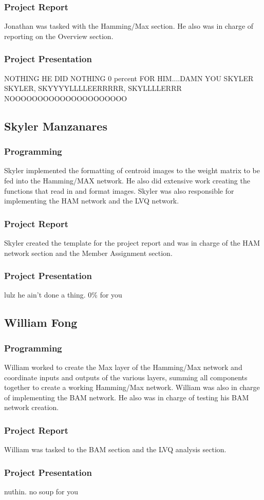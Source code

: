 \documentclass{article}
\begin{document}
\subsubsection{Project Report}
Jonathan was tasked with the Hamming/Max section. He also was in charge of reporting on the Overview section.

\subsubsection{Project Presentation}
NOTHING HE DID NOTHING 0 percent FOR HIM....DAMN YOU SKYLER
SKYLER, SKYYYYLLLLEERRRRR, SKYLLLLERRR NOOOOOOOOOOOOOOOOOOOOO
\subsection{Skyler Manzanares}

\subsubsection{Programming}
Skyler implemented the formatting of centroid images to the weight matrix to be fed into the Hamming/MAX network. He also did extensive work creating the functions that read in and format images. Skyler was also responsible for implementing
the HAM network and the LVQ network.

\subsubsection{Project Report}
Skyler created the template for the project report and was in charge of the HAM 
network section and the Member Assignment section.

\subsubsection{Project Presentation}
lulz he ain't done a thing.  0\% for you

\subsection{William Fong}
\subsubsection{Programming}
William worked to create the Max layer of the Hamming/Max network and coordinate 
inputs and outputs of the various layers, summing all components together to create a working Hamming/Max network. William was also in charge of implementing the BAM network. He also was in charge of testing his BAM network creation.
\subsubsection{Project Report}
William was tasked to the BAM section and the LVQ analysis section.

\subsubsection{Project Presentation}
nuthin. no soup for you 
\end{document}
